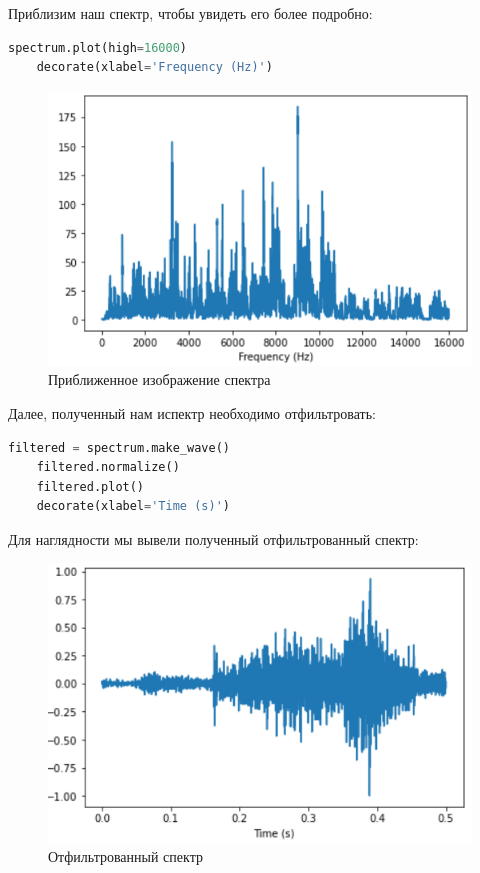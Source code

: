 \documentclass[a4paper]{article}
\begin{document}
            Приблизим наш спектр, чтобы увидеть его более подробно:

\begin{lstlisting}[language=Python, caption= Приближенное изображение спектра]
    spectrum.plot(high=16000)
    decorate(xlabel='Frequency (Hz)')
\end{lstlisting}
            
            \begin{figure}[H]
                \centering
                \includegraphics[width=\textwidth]{spectr_ilustr_add.png}
                \caption{Приближенное изображение спектра}
                \label{fig:spectr_image_add}
            \end{figure}
            
            Далее, полученный нам испектр необходимо отфильтровать:

\begin{lstlisting}[language=Python, caption= Фильтрация спектра]
    filtered = spectrum.make_wave()
    filtered.normalize()
    filtered.plot()
    decorate(xlabel='Time (s)')
\end{lstlisting}

            Для наглядности мы вывели полученный отфильтрованный спектр:
            
             \begin{figure}[H]
                \centering
                \includegraphics[width=\textwidth]{spectr_filter.png}
                \caption{Отфильтрованный спектр}
                \label{fig:spectr_filter}
            \end{figure}
            
\end{document}
